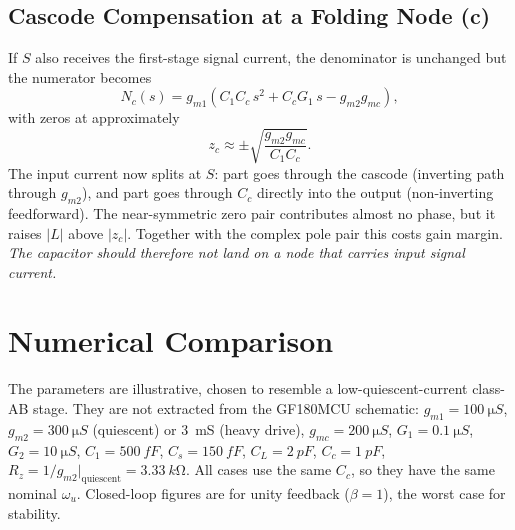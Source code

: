 \documentclass[journal]{IEEEtran}
\newcommand{\gmo}{g_{m1}}
\newcommand{\gmt}{g_{m2}}
\newcommand{\gmc}{g_{mc}}
\begin{document}
\subsection{Cascode Compensation at a Folding Node (c)}
If $S$ also receives the first-stage signal current, the denominator is unchanged but the numerator becomes
\begin{equation}
N_c(s) = \gmo\left(C_1C_c\,s^2 + C_cG_1\,s - \gmt\gmc\right),
\end{equation}
with zeros at approximately
\begin{equation}
z_c \approx \pm\sqrt{\frac{\gmt\gmc}{C_1C_c}}.
\end{equation}
The input current now splits at $S$: part goes through the cascode (inverting path through $\gmt$), and part goes through $C_c$ directly into the output (non-inverting feedforward). The near-symmetric zero pair contributes almost no phase, but it raises $|L|$ above $|z_c|$. Together with the complex pole pair this costs gain margin. \emph{The capacitor should therefore not land on a node that carries input signal current.}

\section{Numerical Comparison}\label{sec:num}
The parameters are illustrative, chosen to resemble a low-quiescent-current class-AB stage. They are not extracted from the GF180MCU schematic:
$\gmo=\SI{100}{\micro S}$,
$\gmt=\SI{300}{\micro S}$ (quiescent) or \SI{3}{mS} (heavy drive),
$\gmc=\SI{200}{\micro S}$,
$G_1=\SI{0.1}{\micro S}$, $G_2=\SI{10}{\micro S}$,
$C_1=\SI{500}{fF}$, $C_s=\SI{150}{fF}$,
$C_L=\SI{2}{pF}$, $C_c=\SI{1}{pF}$,
$R_z = 1/\gmt|_{\text{quiescent}} = \SI{3.33}{k\ohm}$.
All cases use the same $C_c$, so they have the same nominal $\omega_u$. Closed-loop figures are for unity feedback ($\beta=1$), the worst case for stability.
\end{document}
